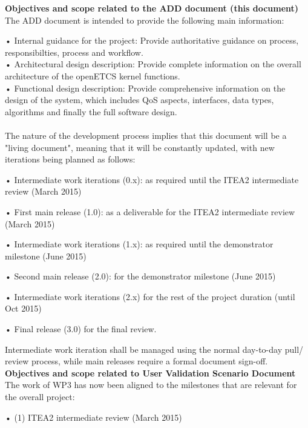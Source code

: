 \textbf{Objectives and scope related to the ADD document (this document)}\\

 



The ADD document is intended to provide the following main information:

• Internal guidance for the project: Provide authoritative guidance on process, responsibilties, process and workflow.\\
 
• Architectural design description: Provide complete information on the overall architecture of the openETCS kernel functions.\\

• Functional design description: Provide comprehensive information on the design of the system, which includes QoS aspects, interfaces, data types, algorithms and finally the full software design.\\
\\

The nature of the development process implies that this document will be a "living document", meaning that it will be constantly updated, with new iterations being planned as follows:

•  Intermediate work iterations (0.x): as required until the ITEA2 intermediate review (March 2015)

• First main release (1.0): as a deliverable for the ITEA2 intermediate review (March 2015)

• Intermediate work iterations (1.x): as required until the demonstrator milestone (June 2015)

•  Second main release (2.0): for the demonstrator milestone (June 2015)

•  Intermediate work iterations (2.x) for the rest of the project duration (until Oct 2015)

•  Final release (3.0) for the final review.

Intermediate work iteration shall be managed using the normal day-to-day pull/ review process, while main releases require a formal document sign-off.\\

\textbf{Objectives and scope related to User Validation Scenario Document}\\

The work of WP3 has now been aligned to the milestones that are relevant for the overall project:

•  (1) ITEA2 intermediate review (March 2015)

